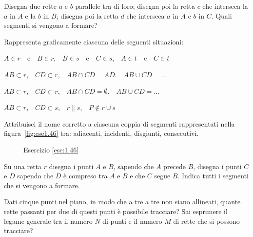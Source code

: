 \begin{esercizio}
Disegna due rette \(a\) e \(b\) parallele tra di loro; disegna poi la 
retta \(c\) che interseca la \(a\) in \(A\) e la \(b\) in \(B\); disegna poi 
la 
retta \(d\) che interseca \(a\) in \(A\) e \(b\) in \(C\). Quali segmenti si 
vengono a formare?
\end{esercizio}

\begin{esercizio}
Rappresenta graficamente ciascuna delle seguenti situazioni:
\begin{enumeratea}
\item \(A\in r\)~~e~~\(B\in r\),~~\(B\in s\)~~e~~\(C\in s\),~~\(A\in 
t\)~~e~~\(C\in t\)
\item \(AB\subset r\),~~\(CD\subset r\),~~\(AB\cap CD=AD\).~~\(AB\cup 
CD=\ldots{}\)
\item \(AB\subset r\),~~\(CD\subset r\),~~\(AB\cap CD=\emptyset\).~~\(AB\cup 
CD=\ldots{}\)
\item \(AB\subset r\),~~\(CD\subset s\),~~\(r\parallel s\),~~\(P\notin r\cup 
s\)
\end{enumeratea}
\end{esercizio}

\begin{esercizio}
Attribuisci il nome corretto a ciascuna coppia di segmenti 
rappresentati nella figura~\ref{fig:ese1.46} tra: adiacenti, 
incidenti, disgiunti, consecutivi.
\end{esercizio}


\begin{inaccessibleblock}
 \begin{figure}[htb]
 \centering
 \caption{Esercizio \ref{ese:1.46}}%
\end{figure}
\end{inaccessibleblock}

\begin{esercizio}
Su una retta \(r\) disegna i punti \(A\) e \(B\), sapendo che \(A\) precede 
\(B\), disegna i punti \(C\) e \(D\) sapendo che \(D\) è compreso tra \(A\) e 
\(B\) e che \(C\) segue \(B\). Indica tutti i segmenti che si vengono a 
formare.
\end{esercizio}

\begin{esercizio}
Dati cinque punti nel piano, in modo che a tre a tre non siano 
allineati, quante rette passanti per due di questi punti è possibile 
tracciare? Sai esprimere il legame generale tra il numero \(N\) di 
punti e il numero \(M\) di rette che si possono tracciare?
\end{esercizio}

